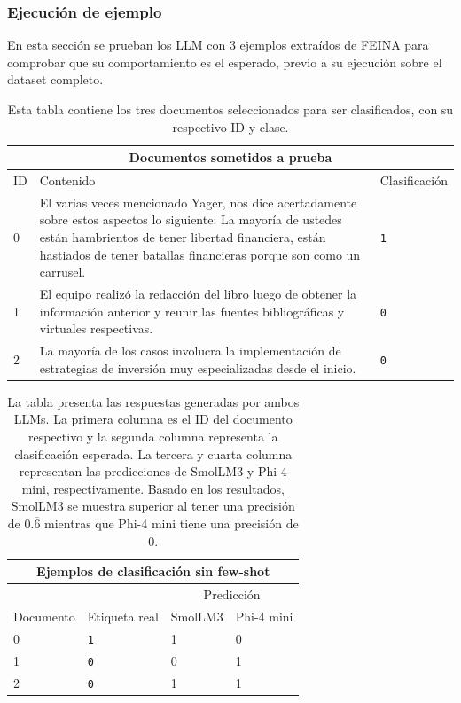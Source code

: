 \documentclass[12pt]{article}
\newcommand{\claseSimple}{\texttt{0}}
\newcommand{\claseCompleja}{\texttt{1}}
\begin{document}
\subsubsection{Ejecución de ejemplo}
En esta sección se prueban los LLM con 3 ejemplos extraídos de FEINA para comprobar que su comportamiento es el esperado, previo a su ejecución sobre el dataset completo.
\begin{table}[H]
\centering
\begin{tabular}{p{}p{}p{}}
\multicolumn{3}{c}{Documentos sometidos a prueba} \\
\toprule
ID & Contenido & Clasificación \\
\midrule
0 & El varias veces mencionado Yager, nos dice acertadamente sobre estos aspectos lo siguiente: La mayoría de ustedes están hambrientos de tener libertad financiera, están hastiados de tener batallas financieras porque son como un carrusel. & \claseCompleja \\
1 & El equipo realizó la redacción del libro luego de obtener la información anterior y reunir las fuentes bibliográficas y virtuales respectivas. & \claseSimple \\
2 & La mayoría de los casos involucra la implementación de estrategias de inversión muy especializadas desde el inicio. & \claseSimple \\
\bottomrule
\end{tabular}
\caption{Esta tabla contiene los tres documentos seleccionados para ser clasificados, con su respectivo ID y clase.}
\end{table}

\begin{table}[H]
\centering
\begin{tabular}{llll}
\multicolumn{4}{c}{Ejemplos de clasificación sin few-shot} \\
\toprule
& & \multicolumn{2}{c}{Predicción} \\
Documento & Etiqueta real & SmolLM3 & Phi-4 mini \\
\midrule
0 & \claseCompleja & 1 & 0 \\
1 & \claseSimple & 0 & 1 \\
2 & \claseSimple & 1 & 1 \\
\bottomrule
\end{tabular}
\caption{La tabla presenta las respuestas generadas por ambos LLMs. La primera columna es el ID del documento respectivo y la segunda columna representa la clasificación esperada. La tercera y cuarta columna representan las predicciones de SmolLM3 y Phi-4 mini, respectivamente.
Basado en los resultados, SmolLM3 se muestra superior al tener una precisión de $0.\overline{6}$ mientras que Phi-4 mini tiene una precisión de 0.}
\label{tab::eje_sinshots}
\end{table}
\end{document}
